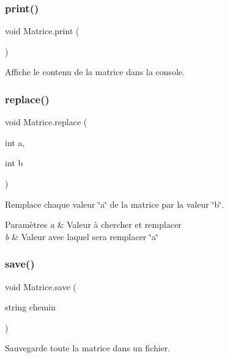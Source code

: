 \subsubsection{\texorpdfstring{print()}{print()}}
{\footnotesize\ttfamily void Matrice.\+print (\begin{DoxyParamCaption}{ }\end{DoxyParamCaption})}



Affiche le contenu de la matrice dans la console. 

\mbox{\label{class_matrice_ae71605cb8df11905415a76eae31d1ad7}} 
\subsubsection{\texorpdfstring{replace()}{replace()}}
{\footnotesize\ttfamily void Matrice.\+replace (\begin{DoxyParamCaption}\item[{int}]{a,  }\item[{int}]{b }\end{DoxyParamCaption})}



Remplace chaque valeur \char`\"{}a\char`\"{} de la matrice par la valeur \char`\"{}b\char`\"{}. 


\begin{DoxyParams}{Paramètres}
{\em a} & Valeur à chercher et remplacer \\
\hline
{\em b} & Valeur avec laquel sera remplacer \char`\"{}a\char`\"{} \\
\hline
\end{DoxyParams}
\mbox{\label{class_matrice_a1cf5f2836440913f2d4743ac19743ff3}} 
\subsubsection{\texorpdfstring{save()}{save()}}
{\footnotesize\ttfamily void Matrice.\+save (\begin{DoxyParamCaption}\item[{string}]{chemin }\end{DoxyParamCaption})}



Sauvegarde toute la matrice dans un fichier. 



